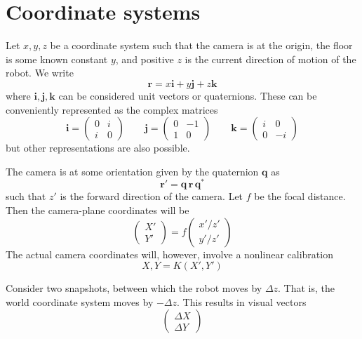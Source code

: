 \documentclass{article}
\def\r{\mathbf{r}}
\def\q{\mathbf{q}}
\def\i{\mathbf{i}}
\def\j{\mathbf{j}}
\def\k{\mathbf{k}}
\begin{document}
\section{Coordinate systems}

Let $x,y,z$ be a coordinate system such that the camera is at the
origin, the floor is some known constant $y$, and positive $z$ is the
current direction of motion of the robot. We write
\begin{equation}
  \r = x\i + y\j + z\k
\end{equation}
where $\i,\j,\k$ can be considered unit vectors or quaternions.  These
can be conveniently represented as the complex matrices
\begin{equation}
\i = \begin{pmatrix} 0 & i  \\ i & 0  \end{pmatrix} \qquad
\j = \begin{pmatrix} 0 & -1 \\ 1 & 0  \end{pmatrix} \qquad
\k = \begin{pmatrix} i & 0  \\ 0 & -i \end{pmatrix}
\end{equation}
but other representations are also possible.

The camera is at some orientation given by the quaternion $\q$ as
\begin{equation}
\r' = \q \, \r \, \q^*
\end{equation}
such that $z'$ is the forward direction of the camera.  Let $f$ be the
focal distance.  Then the camera-plane coordinates will be
\begin{equation}
  \begin{pmatrix} X' \\ Y' \end{pmatrix} =
  f \begin{pmatrix} x'/z' \\ y'/z' \end{pmatrix}
\end{equation}
The actual camera coordinates will, however, involve a nonlinear
calibration
\begin{equation}
  X,Y = K(X',Y')
\end{equation}

Consider two snapshots, between which the robot moves by $\Delta z$.
That is, the world coordinate system moves by $-\Delta z$.  This
results in visual vectors
\begin{equation}
  \begin{pmatrix} \Delta X \\ \Delta Y \end{pmatrix}
\end{equation}
\end{document}
